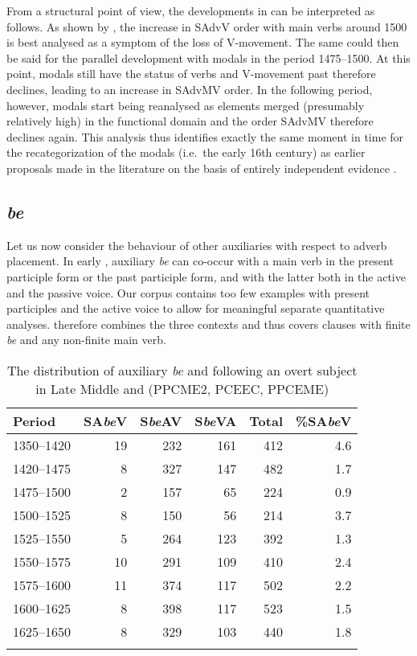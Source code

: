 \documentclass[output=paper]{langsci/langscibook}
\begin{document}
From a structural point of view, the developments in  can be
interpreted as follows. As shown by \citet{HaeIhs2016}, the increase in SAdvV
order with main verbs around 1500 is best analysed as a symptom of the loss of
V-movement. The same could then be said for the parallel development with
modals in the period 1475--1500. At this point, modals still have the status of
verbs and V-movement past  therefore declines, leading to an increase in
{SAdvMV} order. In the following period, however, modals start being reanalysed
as elements merged (presumably relatively high) in the functional domain and
the order SAdvMV therefore declines again. This analysis thus identifies
exactly the same moment in time for the recategorization of the modals (i.e.\
the early 16th century) as earlier proposals made in the literature on the
basis of entirely independent evidence \parencites[cf.\
e.g.][110]{Lightfoot1979}[31]{Lightfoot2006b}[310f.]{Roberts1993}.
%

\subsection{\emph{be}}

Let us now consider the behaviour of other auxiliaries with respect to adverb
placement. In early , auxiliary \emph{be} can co-occur with a main
verb in the present participle form or the past participle form, and with the
latter both in the active and the passive voice. Our corpus contains too few
examples with present participles and the active voice to allow for meaningful
separate quantitative analyses. \Cref{tab:key:09.2} therefore combines the three
contexts and thus covers clauses with finite \emph{be} and any non-finite
main verb.

\begin{table}
\caption{The distribution of auxiliary \emph{be} and  following an
overt subject in Late Middle and  (PPCME2, PCEEC, PPCEME)}%
\label{tab:key:09.2}
\begin{tabular}{lrrrrr}
\lsptoprule
{Period} & {SA\emph{be}V} & {S\emph{be}AV} & {S\emph{be}VA} & {Total} & {\%SA\emph{be}V}\\
\midrule
1350--1420 & 19 & 232 & 161 & 412 & 4.6\\
1420--1475 & 8 & 327 & 147 & 482 & 1.7\\
1475--1500 & 2 & 157 & 65 & 224 & 0.9\\
1500--1525 & 8 & 150 & 56 & 214 & 3.7\\
1525--1550 & 5 & 264 & 123 & 392 & 1.3\\
1550--1575 & 10 & 291 & 109 & 410 & 2.4\\
1575--1600 & 11 & 374 & 117 & 502 & 2.2\\
1600--1625 & 8 & 398 & 117 & 523 & 1.5\\
1625--1650 & 8 & 329 & 103 & 440 & 1.8\\
\lspbottomrule
\end{tabular}
\end{table}
\end{document}
